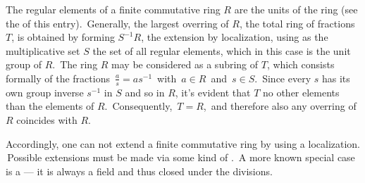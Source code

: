 \documentclass{article}
\theoremstyle{definition}
\begin{document}
The regular elements of a finite commutative ring $R$ are the units of the ring (see the  of this entry). \,Generally, the largest overring of $R$, the total ring of fractions $T$, is obtained by forming $S^{-1}R$, the extension by localization, using as the multiplicative set $S$ the set of all regular elements, which in this case is the unit group of $R$. \,The ring $R$ may be considered as a subring of $T$, which consists formally of the fractions \,$\frac{a}{s} = as^{-1}$\, with \,$a\in R$\, and \,$s\in S$. \,Since every $s$ has its own group inverse $s^{-1}$ in $S$ and so in $R$, it's evident that $T$  no other elements than the elements of $R$. \,Consequently, \,$T = R$,\, and therefore also any overring of $R$ coincides with $R$.

Accordingly, one can not extend a finite commutative ring by using a localization. \,Possible extensions must be made via some kind of . \,A more known special case is a  --- it is always a field and thus closed under the divisions.
\end{document}

